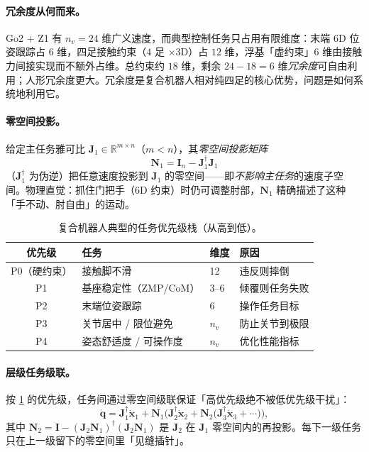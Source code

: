 \paragraph{冗余度从何而来。}
Go2 + Z1 有 $n_v=24$ 维广义速度，而典型控制任务只占用有限维度：末端 $6$D 位姿跟踪占 $6$ 维，四足接触约束（$4$ 足 $\times3$D）占 $12$ 维，浮基「虚约束」$6$ 维由接触力间接实现而不额外占维。总约束约 $18$ 维，剩余 $24-18=6$ 维\emph{冗余度}可自由利用；人形冗余度更大。冗余度是复合机器人相对纯四足的核心优势，问题是如何系统地利用它。

\paragraph{零空间投影。}
给定主任务雅可比 $\mathbf J_1\in\mathbb R^{m\times n}$（$m<n$），其\emph{零空间投影矩阵}
\begin{equation}
  \mathbf N_1=\mathbf I_n-\mathbf J_1^{\dagger}\mathbf J_1
  \label{eq:umm-N1}
\end{equation}
（$\mathbf J_1^{\dagger}$ 为伪逆）把任意速度投影到 $\mathbf J_1$ 的零空间——即\emph{不影响主任务}的速度子空间。物理直觉：抓住门把手（$6$D 约束）时仍可调整肘部，$\mathbf N_1$ 精确描述了这种「手不动、肘自由」的运动。

\begin{table}[H]\centering\small
\caption{复合机器人典型的任务优先级栈（从高到低）。}
\label{tab:umm-stack}
\begin{tabular}{clll}
\toprule
优先级 & 任务 & 维度 & 原因 \\
\midrule
P0（硬约束） & 接触脚不滑 & 12 & 违反则摔倒 \\
P1 & 基座稳定性（ZMP/CoM） & 3--6 & 倾覆则任务失败 \\
P2 & 末端位姿跟踪 & 6 & 操作任务目标 \\
P3 & 关节居中 / 限位避免 & $n_v$ & 防止关节到极限 \\
P4 & 姿态舒适度 / 可操作度 & $n_v$ & 优化性能指标 \\
\bottomrule
\end{tabular}
\end{table}

\paragraph{层级任务级联。}
按 \cref{tab:umm-stack} 的优先级，任务间通过零空间级联保证「高优先级绝不被低优先级干扰」：
\begin{equation}
  \dot{\mathbf q}=\mathbf J_1^{\dagger}\dot{\mathbf x}_1+\mathbf N_1\Big(\mathbf J_2^{\dagger}\dot{\mathbf x}_2+\mathbf N_2\big(\mathbf J_3^{\dagger}\dot{\mathbf x}_3+\cdots\big)\Big),
  \label{eq:umm-cascade}
\end{equation}
其中 $\mathbf N_2=\mathbf I-(\mathbf J_2\mathbf N_1)^{\dagger}(\mathbf J_2\mathbf N_1)$ 是 $\mathbf J_2$ 在 $\mathbf J_1$ 零空间内的再投影。每下一级任务只在上一级留下的零空间里「见缝插针」。

